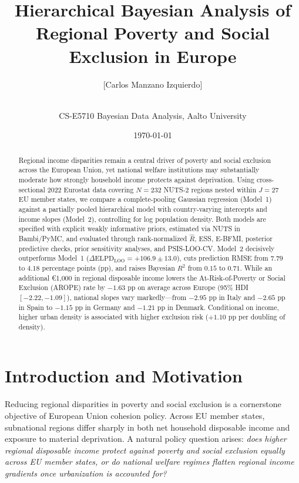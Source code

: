 \documentclass[11pt,a4paper]{article}
\title{\vspace{-1.4cm}\Large\bfseries Hierarchical Bayesian Analysis of Regional Poverty and Social Exclusion in Europe}
\author{[Carlos Manzano Izquierdo] \quad\and\quad [Teammate Name]\\[0.3em]
\small CS-E5710 Bayesian Data Analysis, Aalto University}
\date{\small \today}
\begin{document}
\maketitle
\vspace{-0.8cm}

\begin{abstract}
\noindent Regional income disparities remain a central driver of poverty and social exclusion across the European Union, yet national welfare institutions may substantially moderate how strongly household income protects against deprivation. Using cross-sectional 2022 Eurostat data covering $N = 232$ NUTS-2 regions nested within $J = 27$ EU member states, we compare a complete-pooling Gaussian regression (Model~1) against a partially pooled hierarchical model with country-varying intercepts and income slopes (Model~2), controlling for log population density. Both models are specified with explicit weakly informative priors, estimated via NUTS in Bambi/PyMC, and evaluated through rank-normalized $\hat{R}$, ESS, E-BFMI, posterior predictive checks, prior sensitivity analyses, and PSIS-LOO-CV. Model~2 decisively outperforms Model~1 ($\Delta\text{ELPD}_{\text{LOO}} = +106.9 \pm 13.0$), cuts prediction RMSE from $7.79$ to $4.18$ percentage points (pp), and raises Bayesian $R^2$ from $0.15$ to $0.71$. While an additional \euro{}1,000 in regional disposable income lowers the At-Risk-of-Poverty or Social Exclusion (AROPE) rate by $-1.63\text{ pp}$ on average across Europe (95\% HDI $[-2.22, -1.09]$), national slopes vary markedly---from $-2.95\text{ pp}$ in Italy and $-2.65\text{ pp}$ in Spain to $-1.15\text{ pp}$ in Germany and $-1.21\text{ pp}$ in Denmark. Conditional on income, higher urban density is associated with higher exclusion risk ($+1.10\text{ pp}$ per doubling of density).
\end{abstract}

\section{Introduction and Motivation}

Reducing regional disparities in poverty and social exclusion is a cornerstone objective of European Union cohesion policy. Across EU member states, subnational regions differ sharply in both net household disposable income and exposure to material deprivation. A natural policy question arises: \emph{does higher regional disposable income protect against poverty and social exclusion equally across EU member states, or do national welfare regimes flatten regional income gradients once urbanization is accounted for?}
\end{document}
